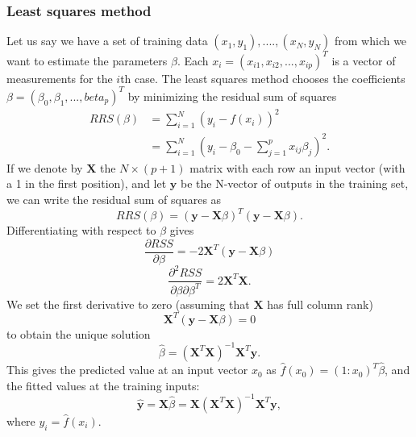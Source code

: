 \documentclass[12pt]{article}
\begin{document}
\subsubsection{Least squares method}
Let us say we have a set of training data $(x_1,y_1),....,(x_N,y_N)$ from which we want to estimate the parameters $\beta$. Each $x_i = (x_{i1},x_{i2},...,x_{ip})^T$ is a vector of measurements for the $i$th case. The least squares method chooses the coefficients $\beta = (\beta_0,\beta_1,...,beta_p)^T$ by minimizing the residual sum of squares
\begin{equation} \label{eq:least_squares}
\begin{split}
RRS(\beta) &= \sum_{i=1}^{N}(y_i-f(x_i))^2\\
&= \sum_{i=1}^{N}(y_i-\beta_0-\sum_{j=1}^{p}x_{ij}\beta_j)^2.
\end{split}
\end{equation}
If we denote by $\bm{X}$ the $N\times(p+1)$ matrix with each row an input vector (with a 1 in the first position), and let $\bm{y}$ be the N-vector of outputs in the training set, we can write the residual sum of squares as
\begin{equation}
RRS(\beta) = (\bm{y}-\bm{X}\beta)^T(\bm{y}-\bm{X}\beta).
\end{equation}
Differentiating with respect to $\beta$ gives
\begin{equation}
\frac{\partial RSS}{\partial \beta} = -2\bm{X}^T(\bm{y}-\bm{X}\beta)
\end{equation}
\begin{equation}
\frac{\partial^2RSS}{\partial \beta \partial \beta^T} = 2\bm{X}^T\bm{X}.
\end{equation}
We set the first derivative to zero (assuming that $\bm{X}$ has full column rank)
\begin{equation}
\bm{X}^T(\bm{y}-\bm{X}\beta) = 0
\end{equation}
to obtain the unique solution
\begin{equation}
\hat{\beta} = (\bm{X}^T\bm{X})^{-1}\bm{X}^T\bm{y}.
\end{equation}
This gives the predicted value at an input vector $x_0$ as $\hat{f}(x_0)=(1:x_0)^T\hat{\beta}$, and the fitted values at the training inputs:
\begin{equation}
\hat{\bm{y}}=\bm{X}\hat{\beta}=\bm{X}(\bm{X}^T\bm{X})^{-1}\bm{X}^T\bm{y},
\end{equation}
where $\hat{y_i}=\hat{f}(x_i)$.\\ \\
\end{document}
